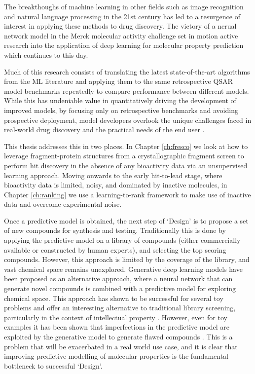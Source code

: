 The breakthoughs of machine learning in other fields such as image recognition and natural language processing in the 21st century has led to a resurgence of interest in applying these methods to drug discovery. The victory of a nerual network model in the Merck molecular activity challenge \cite{Ma2015MerckMolecularActivity} set in motion active research into the application of deep learning for molecular property prediction which continues to this day.

Much of this research consists of translating the latest state-of-the-art algorithms from the ML literature and applying them to the same retrospective QSAR model benchmarks repeatedly to compare performance between different models. While this has undeniable value in quantitatively driving the development of improved models, by focusing only on retrospective benchmarks and avoiding prospective deployment, model developers overlook the unique challenges faced in real-world drug discovery and the practical needs of the end user \cite{Kearnes2021Prospective}.

This thesis addresses this in two places. In Chapter \ref{ch:fresco} we look at how to leverage fragment-protein structures from a crystallographic fragment screen to perform hit discovery in the absence of any bioactivity data via an unsupervised learning approach. Moving onwards to the early hit-to-lead stage, where bioactivity data is limited, noisy, and dominated by inactive molecules, in Chapter \ref{ch:ranking} we use a learning-to-rank framework to make use of inactive data and overcome experimental noise.

Once a predictive model is obtained, the next step of `Design' is to propose a set of new compounds for synthesis and testing. Traditionally this is done by applying the predictive model on a library of compounds (either commercially available or constructed by human experts), and selecting the top scoring compounds. However, this approach is limited by the coverage of the library, and vast chemical space remains unexplored. Generative deep learning models have been proposed as an alternative approach, where a neural network that can generate novel compounds is combined with a predictive model for exploring chemical space. This approach has shown to be successful for several toy problems and offer an interesting alternative to traditional library screening, particularly in the context of intellectual property \cite{Meyers2021DeNovo}. However, even for toy examples it has been shown that imperfections in the predictive model are exploited by the generative model to generate flawed compounds \cite{Renz2019FailureModes}. This is a problem that will be exacerbated in a real world use case, and it is clear that improving predictive modelling of molecular properties is the fundamental bottleneck to successful `Design'.

